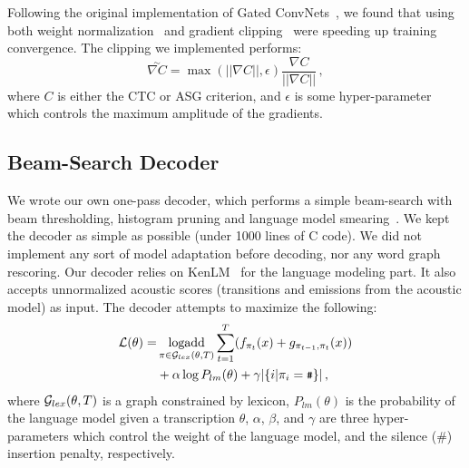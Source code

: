 \documentclass{article}
\DeclareMathOperator*{\logadd}{logadd}
\begin{document}
Following the original implementation of Gated
ConvNets~\citep{dauphin2017lm}, we found that using both weight
normalization~\citep{salimans2016wn} and gradient
clipping~\citep{pascanu2013rnn} were speeding up training convergence. The clipping
we implemented performs:
\begin{equation}
  \label{eq-clipping}
\overset{\sim}{\nabla C} =  \max(||\nabla C||, \epsilon) \frac{\nabla C}{||\nabla C||}\,,
\end{equation}
where $C$ is either the CTC or ASG criterion, and $\epsilon$ is some
hyper-parameter which controls the maximum amplitude of the gradients.

\subsection{Beam-Search Decoder}
\label{sec-decoder}
We wrote our own one-pass decoder, which performs a simple beam-search with
beam thresholding, histogram pruning and language model
smearing~\citep{steinbiss1994improvements}. We kept the decoder as simple as
possible (under 1000 lines of C code). We did not implement any sort of
model adaptation before decoding, nor any word graph rescoring. Our decoder
relies on KenLM~\citep{heafield2013scalable} for the language modeling
part. It also accepts unnormalized acoustic scores (transitions and
emissions from the acoustic model) as input. The decoder attempts to maximize
the following:
\begin{equation}
  \label{eq-decoder}
  \begin{split}
    {\cal L}(\theta) =  & \logadd_{\pi \in {\cal G}_{lex}(\theta, T)} \sum_{t=1}^T (f_{\pi_t}(x)+g_{\pi_{t-1},\pi_t}(x)) \\
                        & + \alpha \log P_{lm}(\theta) + \gamma |\{i| \pi_i = \textrm{\texttt{\small \#}}\}|\,,
    \end{split}
\end{equation}
where ${\cal G}_{lex}(\theta, T)$ is a graph constrained by lexicon,
$P_{lm}(\theta)$ is the probability of the language model given a
transcription $\theta$, $\alpha$, $\beta$, and $\gamma$ are three
hyper-parameters which control the weight of the language model, 
and the silence (\#) insertion penalty, respectively.
\end{document}
